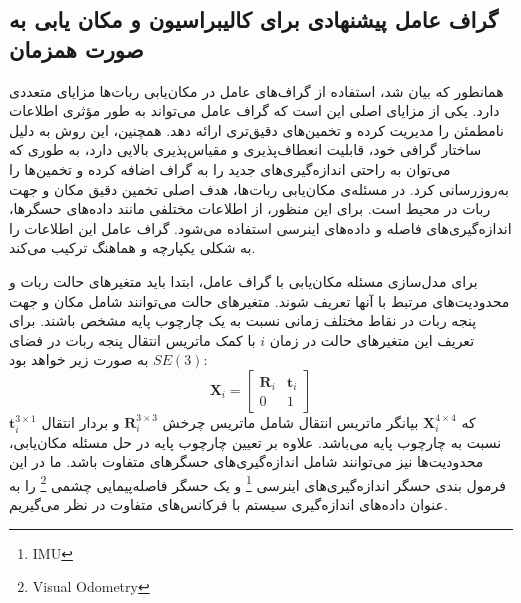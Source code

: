 \subsection{گراف عامل پیشنهادی برای کالیبراسیون و مکان یابی به صورت همزمان}
  
همانطور که بیان شد، استفاده از گراف‌های عامل در مکان‌یابی ربات‌ها مزایای متعددی دارد. یکی از مزایای اصلی این است که گراف عامل می‌تواند به طور مؤثری اطلاعات نامطمئن را مدیریت کرده و تخمین‌های دقیق‌تری ارائه دهد. همچنین، این روش به دلیل ساختار گرافی خود، قابلیت انعطاف‌پذیری و مقیاس‌پذیری بالایی دارد، به طوری که می‌توان به راحتی اندازه‌گیری‌های جدید را به گراف اضافه کرده و تخمین‌ها را به‌روزرسانی کرد. در مسئله‌ی مکان‌یابی ربات‌ها، هدف اصلی تخمین دقیق مکان و جهت ربات در محیط است. برای این منظور، از اطلاعات مختلفی مانند داده‌های حسگرها، اندازه‌گیری‌های فاصله و داده‌های اینرسی استفاده می‌شود. گراف عامل این اطلاعات را به شکلی یکپارچه و هماهنگ ترکیب می‌کند.

برای مدل‌سازی مسئله مکان‌یابی با گراف عامل، ابتدا باید متغیرهای حالت ربات و محدودیت‌های مرتبط با آنها تعریف شوند. متغیرهای حالت می‌توانند شامل مکان و جهت پنجه ربات در نقاط مختلف زمانی نسبت به یک چارچوب پایه مشخص باشند. برای تعریف این متغیرهای حالت در زمان $i$ با کمک ماتریس انتقال پنجه ربات در فضای
$SE(3)$
به صورت زیر خواهد بود:
\begin{equation} \label{eq:transformation matrix}
	\boldsymbol{X}_i = \begin{bmatrix}
							\mathbf{R}_i & \mathbf{t}_i \\
								0 & 1
				     	\end{bmatrix}
\end{equation}
که 
$\boldsymbol{X}_i^{4\times4}$
 بیانگر ماتریس انتقال شامل ماتریس چرخش 
$\mathbf{R}_i^{3\times3}$
 و بردار انتقال 
 $ \mathbf{t}_i^{3\times1}$ 
 نسبت به چارچوب پایه می‌باشد. علاوه بر تعیین چارچوب پایه در حل مسئله مکان‌یابی، محدودیت‌ها نیز می‌توانند
شامل اندازه‌گیری‌های حسگرهای متفاوت باشد. 
 ما در این فرمول بندی
 حسگر اندازه‌گیری‌های اینرسی
\footnote{IMU} 
 و یک حسگر فاصله‌پیمایی چشمی
\footnote{Visual Odometry}
را به عنوان داده‌های اندازه‌گیری سیستم با فرکانس‌های متفاوت در نظر می‌گیریم. 

